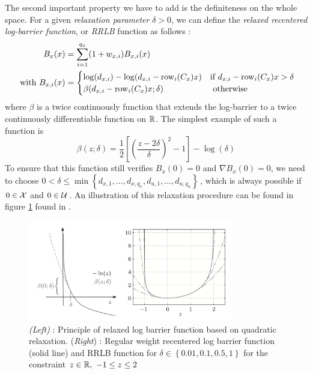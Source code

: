 \documentclass[12pt]{article}
\begin{document}
The second important property we have to add is the definiteness on the whole space.
For a given \textit{relaxation parameter} $\delta>0$, we can define the \textit{relaxed recentered log-barrier function}, or \textit{RRLB} function as follows :
\begin{align}
	\begin{split}
		\label{RRLB}
		B_x(x)&=\sum_{i=1}^{q_x}(1+w_{x,i})B_{x,i}(x)\\
		\text{ with }B_{x,i}(x)&=\begin{cases}
			\log(d_{x,i})-\log(d_{x,i}-\rm{row}_i(C_x)x)&\text{if }d_{x,i}-\rm{row}_i(C_x)x>\delta\\
			\beta(d_{x,i}-\rm{row}_i(C_x)x;\delta)&\text{ otherwise}
		\end{cases}
	\end{split}
\end{align}
where $\beta$ is a twice continuously function that extends the log-barrier to a twice continuously differentiable function on $\R$.
The simplest example of such a function is
$$\beta(z;\delta)=\frac{1}{2}\left[ \left( \frac{z-2\delta}{\delta} \right)^2-1 \right]-\log(\delta)$$
To ensure that this function still verifies $B_x(0)=0$ and $\nabla B_x(0)=0$, we need to choose $0<\delta\leq\min\left\{d_{x,1},\dots,d_{x,q_x},d_{u,1},\dots,d_{u,q_u}\right\}$\,, which is always possible if $0\in\cal{X}$ and $0\in\cal{U}$\,.
An illustration of this relaxation procedure can be found in figure \ref{fig:RRLB-functions} found in \cite{rti-diehl}.

\begin{figure}
	\centering
	\includegraphics[width=0.8\textwidth]{images/rrlb-functions.png}
	\caption{\textit{(Left)} : Principle of relaxed log barrier function based on quadratic relaxation. (\textit{Right}) : Regular weight recentered log barrier function (solid line) and RRLB function for $\delta\in\left\{ 0.01,0.1,0.5,1 \right\}$ for the constraint $z\in\R,~-1\leq z\leq 2$}
	\label{fig:RRLB-functions}
\end{figure}
\end{document}
